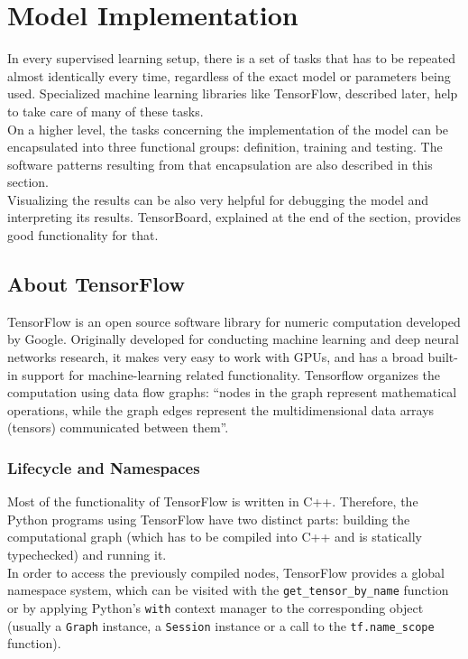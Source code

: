   \section{Model Implementation}

  In every supervised learning setup, there is a set of tasks that has to be repeated almost identically every time, regardless of the exact model or parameters being used. Specialized machine learning libraries like TensorFlow, described later, help to take care of many of these tasks.\\

  On a higher level, the tasks concerning the implementation of the model can be encapsulated into three functional groups: definition, training and testing. The software patterns resulting from that encapsulation are also described in this section.\\

  Visualizing the results can be also very helpful for debugging the model and interpreting its results. TensorBoard, explained at the end of the section, provides good functionality for that.

  \subsection{About TensorFlow}

  TensorFlow is an open source software library for numeric computation developed by Google\cite{tflow}. Originally developed for conducting machine learning and deep neural networks research, it makes very easy to work with GPUs, and has a broad built-in support for machine-learning related functionality. Tensorflow organizes the computation using data flow graphs: ``nodes in the graph represent mathematical operations, while the graph edges represent the multidimensional data arrays (tensors) communicated between them''\cite{tflow}.

  \subsubsection{Lifecycle and Namespaces}

  Most of the functionality of TensorFlow is written in C++. Therefore, the Python programs using TensorFlow have two distinct parts: building the computational graph (which has to be compiled into C++ and is statically typechecked) and running it.\\

  In order to access the previously compiled nodes, TensorFlow provides a global namespace system, which can be visited with the \texttt{get\_tensor\_by\_name} function or by applying Python's \texttt{with} context manager to the corresponding object (usually a \texttt{Graph} instance, a \texttt{Session} instance or a call to the \texttt{tf.name\_scope} function).



